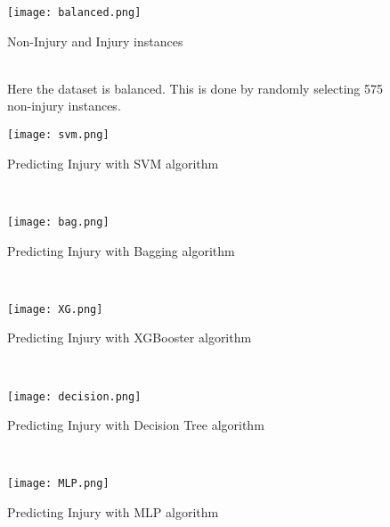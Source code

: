 \documentclass[12pt, English]{article}
\begin{document}
\begin{normalsize}
\afterpage{\clearpage}
\begin{figure}[htb]
\begin{center}
\texttt{[image: balanced.png]}
\end{center}
\begin{center}
\renewcommand{\thefigure}{4.2.5}
\caption{\footnotesize Non-Injury and Injury instances}
\end{center}
\\
Here the dataset is balanced. This is done by randomly selecting 575 non-injury instances.
\begin{center} 
\texttt{[image: svm.png]}
\end{center}
\begin{center}
\renewcommand{\thefigure}{4.2.6}
\caption{\footnotesize Predicting Injury with SVM algorithm}
\end{center}
\end{figure}\\

\begin{figure}[htb]
\begin{center}
\texttt{[image: bag.png]}
\end{center}
\begin{center}
\renewcommand{\thefigure}{4.2.7}
\caption{\footnotesize Predicting Injury with Bagging algorithm }
\end{center}
\\
\begin{center}
\texttt{[image: XG.png]}
\end{center}
\begin{center}
\renewcommand{\thefigure}{4.2.8}
\caption{\footnotesize Predicting Injury with XGBooster algorithm}
\end{center}
\end{figure}\\

\begin{figure}[htb]
\begin{center}
\texttt{[image: decision.png]}
\end{center}
\begin{center}
\renewcommand{\thefigure}{4.2.9}
\caption{\footnotesize Predicting Injury with Decision Tree algorithm }
\end{center}
\\
\begin{center}
\texttt{[image: MLP.png]}
\end{center}
\begin{center}
\renewcommand{\thefigure}{4.2.10}
\caption{\footnotesize Predicting Injury with MLP algorithm}
\end{center}
\end{figure}\\


\end{normalsize}
\end{document}
